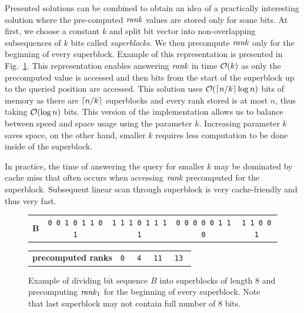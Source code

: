Presented solutions can be combined to obtain an idea of a practically
interesting solution where the pre-computed $\mathit{rank}$ values are stored only for some
bits. At first, we choose a constant $k$ and split bit vector into non-overlapping
subsequences of $k$ bits called \textit{superblocks}. We then precompute $\mathit{rank}$ only for
the beginning of every superblock. Example of this representation is presented in
Fig.~\ref{obr:practicalRank}. This representation enables answering $\mathit{rank}$ in time
$\mathcal{O}(k)$ as only the precomputed value is accessed and then bits from the start of the
superblock up to the queried position are accessed. This solution uses $\mathcal{O}(\left\lceil n/k \right\rceil\log n)$
bits of memory as there are $\left\lceil n/k \right\rceil$ superblocks and every rank stored is at most $n$,
thus taking $\mathcal{O}(\log n)$ bits. This version of the implementation allows us to balance between
speed and space usage using the parameter $k$. Increasing parameter $k$ saves space, on the other
hand, smaller $k$ requires less computation to be done inside of the superblock.

In practice, the time of answering the query for smaller $k$ may be dominated by cache miss
that often occurs when accessing $\mathit{rank}$ precomputed for the superblock. Subsequent linear
scan through superblock is very cache-friendly and thus very fast.


\begin{figure}
	\begin{tabular}{c|c|c|c|c|}
	\cline{2-5}
	\textbf{B} & {\tt 0 0 1 0 1 1 0 1} & {\tt 1 1 1 0 1 1 1 1} & {\tt 0 0 0 0 0 1 1 0} & {\tt 1 1 0 0 1} \\ \cline{2-5}
	\end{tabular}

    \bigskip

    \begin{tabular}{c|c|c|c|c|}
        \cline{2-5}
        \textbf{precomputed ranks} & \tt 0 & \tt 4 & \tt 11 & \tt 13 \\ \cline{2-5}
        \end{tabular}

	\caption[TODO]{Example of dividing bit sequence $B$ into superblocks of length 8 and precomputing
    $\mathit{rank}_1$ for the beginning of every superblock. Note that last superblock may not contain full
    number of 8 bits.}
	\label{obr:practicalRank}
\end{figure}

